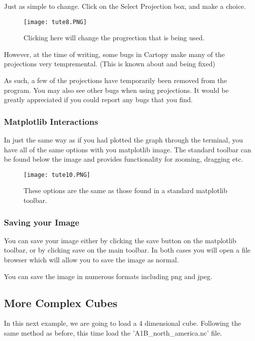 \documentclass[a4paper,12pt]{article}
\begin{document}
Just as simple to change. Click on the Select Projection box, and make a choice.

\begin{figure}[H]
\centering
\texttt{[image: tute8.PNG]}
\caption{Clicking here will change the progrection that is being used.}
\label{overflow}
\end{figure}

However, at the time of writing, some bugs in Cartopy make many of the
projections very tempremental. (This is known about and being fixed)

As such, a few of the projections have temporarily been removed from the
program. You may also see other bugs when using projections. It would be
greatly appreciated if you could report any bugs that you find.


\subsubsection{Matplotlib Interactions}

In just the same way as if you had plotted the graph through the terminal,
you have all of the same options with you matplotlib image. The standard
toolbar can be found below the image and provides functionality for
zooming, dragging etc.

\begin{figure}[h]
\centering
\texttt{[image: tute10.PNG]}
\caption{These options are the same as those found in a standard matplotlib
toolbar.}
\label{overflow}
\end{figure}

\subsubsection{Saving your Image}

You can save your image either by clicking the save button on the matplotlib
toolbar, or by clicking save on the main toolbar. In both cases you will open a
file browser which will allow you to save the image as normal.

You can save the image in numerous formats including png and jpeg.

\subsection{More Complex Cubes}

In this next example, we are going to load a 4 dimensional cube. Following the
same method as before, this time load the 'A1B\_north\_america.nc' file.
\end{document}
